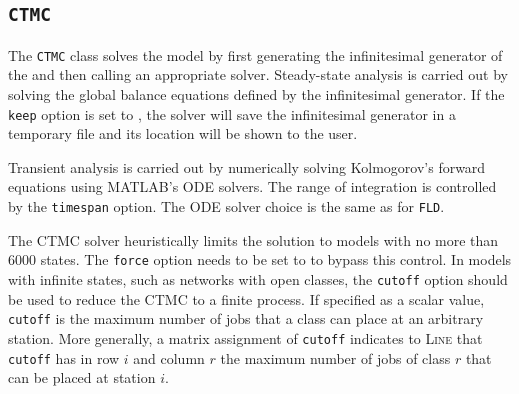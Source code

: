 
\subsection{\texttt{CTMC}}
The \texttt{CTMC} class solves the model by first generating the infinitesimal generator of the  and then calling an appropriate solver. Steady-state analysis is carried out by solving the global balance equations defined by the infinitesimal generator. If the \texttt{keep} option is set to , the solver will save the infinitesimal generator in a temporary file and its location will be shown to the user.

Transient analysis is carried out by numerically solving Kolmogorov's forward equations using MATLAB's ODE solvers. The range of integration is controlled by the \texttt{timespan} option. The ODE solver choice is the same as for \texttt{FLD}.

The CTMC solver heuristically limits the solution to models with no more than 6000 states. The \texttt{force} option needs to be set to  to bypass this control. In models with infinite states, such as networks with open classes, the \texttt{cutoff} option should be used to reduce the CTMC to a finite process. If specified as a scalar value, \texttt{cutoff} is the maximum number of jobs that a class can place at an arbitrary station. More generally, a matrix assignment of \texttt{cutoff} indicates to \textsc{Line} that \texttt{cutoff} has in row $i$ and column $r$ the maximum number of jobs of class $r$ that can be placed at station $i$.

